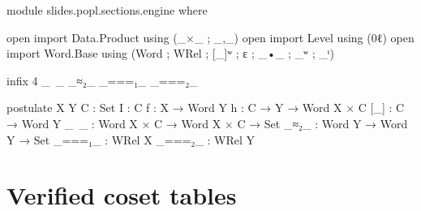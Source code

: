 \begin{code}[hide]
module slides.popl.sections.engine where

open import Data.Product using (_×_ ; _,_)
open import Level using (0ℓ)
open import Word.Base using (Word ; WRel ; [_]ʷ ; ε ; _•_ ; _ʷ ; _ᵗ)

infix 4 _~_ _≈₂_ _===₁_ _===₂_

postulate
  X Y C  : Set
  I      : C
  f      : X → Word Y
  h      : C → Y → Word X × C
  [_]    : C → Word Y
  _~_    : Word X × C → Word X × C → Set
  _≈₂_   : Word Y → Word Y → Set
  _===₁_ : WRel X
  _===₂_ : WRel Y
\end{code}
\section{Verified coset tables}

